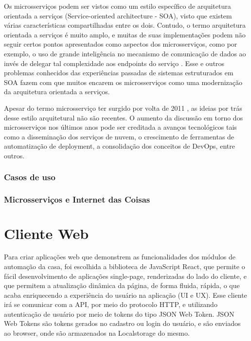 Os microsserviços podem ser vistos como um estilo específico de arquitetura orientada a serviços (Service-oriented architecture - SOA), visto que existem várias características compartilhadas entre os dois. Contudo, o termo arquitetura orientada a serviços é muito amplo, e muitas de suas implementações podem não seguir certos pontos apresentados como aspectos dos microsserviços, como por exemplo, o uso de grande inteligência no mecanismo de comunicação de dados ao invés de delegar tal complexidade aos endpoints do serviço \cite{james}. Esse e outros problemas conhecidos das experiências passadas de sistemas estruturados em SOA fazem com que muitos encarem os microsserviços como uma modernização da arquitetura orientada a serviços.

Apesar do termo microsserviço ter surgido por volta de 2011 \cite{james}, as ideias por trás desse estilo arquitetural não são recentes. O aumento da discussão em torno dos microsserviços nos últimos anos pode ser creditada a avanços tecnológicos tais como a disseminação dos serviços de nuvem, o crescimento de ferramentas de automatização de deployment, a consolidação dos conceitos de DevOps, entre outros.

\subsubsection{Casos de uso} %

\subsubsection{Microsserviços e Internet das Coisas} %

\section{Cliente Web}
Para criar aplicações web que demonstrem as funcionalidades dos módulos de automação da casa, foi escolhida a biblioteca de JavaScript React, que permite o fácil desenvolvimento de aplicações single-page, renderizadas do lado do cliente, e que permitem a atualização dinâmica da página, de forma fluida, rápida, o que acaba enriquecendo a experiência do usuário na aplicação (UI e UX). Esse cliente irá se comunicar com a API, por meio do protocolo HTTP, e utilizando autenticação de usuário por meio  de tokens do tipo JSON Web Token. JSON Web Tokens são tokens gerados no cadastro ou login do usuário, e são enviados ao browser, onde são armazenados na Localstorage do mesmo.

